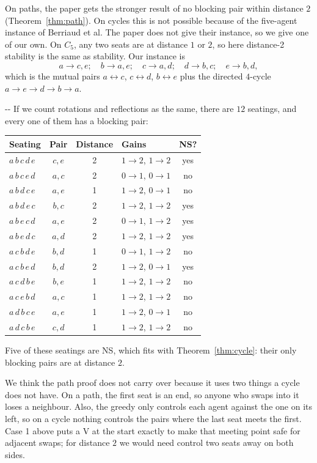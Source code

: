 \documentclass[11pt,a4paper]{article}
\makeatletter
\newcommand{\needspace}[1]{\par\penalty-100\begingroup\setlength{\dimen@}{#1}\dimen@ii\pagegoal\advance\dimen@ii-\pagetotal\ifdim\dimen@>\dimen@ii\ifdim\dimen@ii>\z@\vfil\fi\penalty-\@M\fi\endgroup}
\theoremstyle{definition}
\theoremstyle{remark}
\theoremstyle{plain}
\makeatother
\begin{document}
On paths, the paper gets the stronger result of no blocking pair within distance $2$ (Theorem~\ref{thm:path}). On cycles this is not possible because of the five-agent instance of Berriaud et al. The paper does not give their instance, so we give one of our own. On $C_5$, any two seats are at distance $1$ or $2$, so here distance-2 stability is the same as stability. Our instance is
\[
a\to c,e;\quad b\to a,e;\quad c\to a,d;\quad d\to b,c;\quad e\to b,d,
\]
which is the mutual pairs $a\leftrightarrow c$, $c\leftrightarrow d$, $b\leftrightarrow e$ plus the directed $4$-cycle $a\to e\to d\to b\to a$.

\needspace{17\baselineskip}
\noindent If we count rotations and reflections as the same, there are $12$ seatings, and every one of them has a blocking pair:
\begin{center}
\small
\begin{tabular}{@{}lcclc@{}}
\toprule
Seating & Pair & Distance & Gains & NS? \\
\midrule
$a\,b\,c\,d\,e$ & $c,e$ & 2 & $1\to2$, $1\to2$ & yes \\
$a\,b\,c\,e\,d$ & $a,c$ & 2 & $0\to1$, $0\to1$ & no \\
$a\,b\,d\,c\,e$ & $a,e$ & 1 & $1\to2$, $0\to1$ & no \\
$a\,b\,d\,e\,c$ & $b,c$ & 2 & $1\to2$, $1\to2$ & yes \\
$a\,b\,e\,c\,d$ & $a,e$ & 2 & $0\to1$, $1\to2$ & yes \\
$a\,b\,e\,d\,c$ & $a,d$ & 2 & $1\to2$, $1\to2$ & yes \\
$a\,c\,b\,d\,e$ & $b,d$ & 1 & $0\to1$, $1\to2$ & no \\
$a\,c\,b\,e\,d$ & $b,d$ & 2 & $1\to2$, $0\to1$ & yes \\
$a\,c\,d\,b\,e$ & $b,e$ & 1 & $1\to2$, $1\to2$ & no \\
$a\,c\,e\,b\,d$ & $a,c$ & 1 & $1\to2$, $1\to2$ & no \\
$a\,d\,b\,c\,e$ & $a,e$ & 1 & $1\to2$, $0\to1$ & no \\
$a\,d\,c\,b\,e$ & $c,d$ & 1 & $1\to2$, $1\to2$ & no \\
\bottomrule
\end{tabular}
\end{center}
Five of these seatings are NS, which fits with Theorem~\ref{thm:cycle}: their only blocking pairs are at distance $2$.

We think the path proof does not carry over because it uses two things a cycle does not have. On a path, the first seat is an end, so anyone who swaps into it loses a neighbour. Also, the greedy only controls each agent against the one on its left, so on a cycle nothing controls the pairs where the last seat meets the first. Case 1 above puts a V at the start exactly to make that meeting point safe for adjacent swaps; for distance $2$ we would need control two seats away on both sides.
\end{document}
